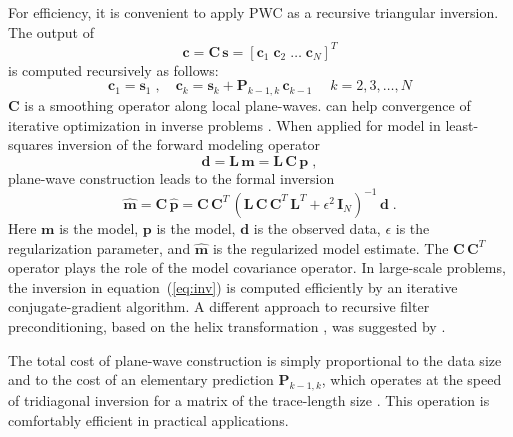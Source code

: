 For efficiency, it is convenient to apply PWC as a recursive triangular inversion. The output
of
\begin{equation}
  \label{eq:pwc}
  \mathbf{c} = \mathbf{C\,s} = \left[\mathbf{c}_1 \; \mathbf{c}_2 \; \ldots \;
    \mathbf{c}_N\right]^T
\end{equation}
is computed recursively as follows:
\begin{equation}
  \label{eq:rec}
  \mathbf{c}_1 = \mathbf{s}_1\;,\quad
  \mathbf{c}_k = \mathbf{s}_k + \mathbf{P}_{k-1,k}\,\mathbf{c}_{k-1}\;\quad
  k=2,3,\ldots,N
\end{equation}
$\mathbf{C}$ is a smoothing operator along local
plane-waves.  can help 
 convergence of iterative optimization in inverse
problems \cite[]{harlan,GEO68-02-05770588}.  When applied for model
  in least-squares
inversion of the forward modeling operator
\begin{equation}
  \label{eq:for}
  \mathbf{d} = \mathbf{L\,m} = \mathbf{L\,C\,p}\;,
\end{equation}
plane-wave construction leads to the formal inversion
\begin{equation}
  \label{eq:inv}
  \widehat{\mathbf{m}} = \mathbf{C}\,\widehat{\mathbf{p}} =
\mathbf{C\,C}^T\,\left(\mathbf{L\,C\,C}^T\,\mathbf{L}^T + \epsilon^2\,\mathbf{I}_N\right)^{-1}\,\mathbf{d}\;.
\end{equation}
Here $\mathbf{m}$ is the model, $\mathbf{p}$ is the  
model, $\mathbf{d}$ is the observed data, $\epsilon$ is the
regularization parameter, and $\widehat{\mathbf{m}}$ is the
regularized model estimate. The $\mathbf{C}\,\mathbf{C}^T$ operator
plays the role of the model covariance operator. %
In large-scale
problems, the inversion in equation~(\ref{eq:inv}) is computed efficiently by
an iterative conjugate-gradient algorithm.  A different approach to recursive
filter preconditioning, based on the helix transformation
\cite[]{GEO63-05-15321541}, was suggested by \cite{GEO68-02-05770588}.

The total cost of plane-wave construction is simply proportional to the data
size and to the cost of an elementary prediction $\mathbf{P}_{k-1,k}$, which
operates at the speed of tridiagonal inversion for a matrix of the
trace-length size \cite[]{GEO67-06-19461960}. This operation is comfortably
efficient in practical applications.

